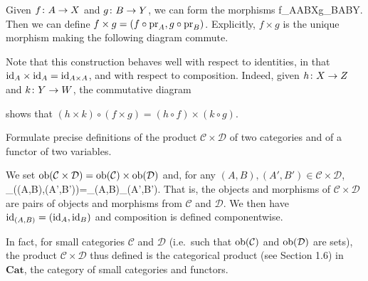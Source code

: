 \item Given $f\colon A\to X$ and $g\colon B\to Y$, we can form the morphisms
\bse
f\circ\pr_A\cl A\times B\to X\qquad {}\qquad g\circ \pr_B\cl A\times B\to Y.
\ese
Then we can define $f\times g=(f\circ\mathrm{pr}_A,g\circ\mathrm{pr}_B)$. Explicitly, $f\times g$ is the unique morphism making the following diagram commute.
\bse
{}
\ese
Note that this construction behaves well with respect to identities, in that $\mathrm{id}_A\times\mathrm{id}_A=\mathrm{id}_{A\times A}$, and with respect to composition. Indeed, given $h\colon X\to Z$ and $k\colon Y\to W$, the commutative diagram
\bse
{}
\ese
shows that $(h\times k)\circ(f\times g)=(h\circ f)\times(k\circ g)$.
\een
\es

\bx
Formulate precise definitions of the product $\mathcal{C}\times \mathcal{D}$ of two categories and of a functor of two variables.
\ex

\bs
We set $\operatorname{ob}(\mathcal{C}\times \mathcal{D})=\operatorname{ob}(\mathcal{C})\times\operatorname{ob}(\mathcal{D})$ and, for any $(A,B),(A',B')\in\mathcal{C}\times \mathcal{D}$,
\bse
\mor_{\times {}}((A,B),(A',B'))=\mor_{}(A,B)\times \mor_{}(A',B').
\ese
That is, the objects and morphisms of $\mathcal{C}\times \mathcal{D}$ are pairs of objects and morphisms from $\mathcal{C}$ and $\mathcal{D}$. We then have $\mathrm{id}_{(A,B)}=(\mathrm{id}_A,\mathrm{id}_B)$ and composition is defined componentwise.

In fact, for small categories $\mathcal{C}$ and $\mathcal{D}$ (i.e.\ such that $\operatorname{ob}(\mathcal{C})$ and $\operatorname{ob}(\mathcal{D})$ are sets), the product $\mathcal{C}\times \mathcal{D}$ thus defined is the categorical product (see Section 1.6) in $\mathbf{Cat}$, the category of small categories and functors.

